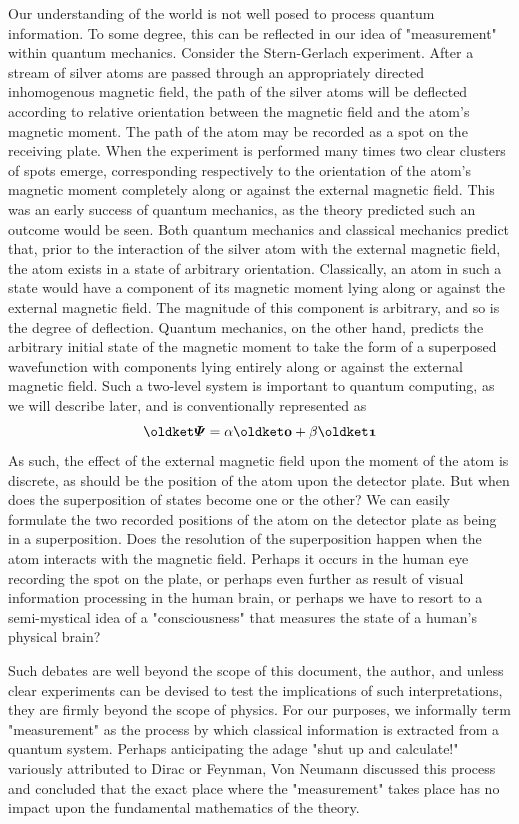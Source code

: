 Our understanding of the world is not well posed to process quantum information.
To some degree, this can be reflected in our idea of "measurement" within
quantum mechanics. Consider the Stern-Gerlach experiment\cite{SternGerlach}.
After a stream of silver atoms are passed through an appropriately directed
inhomogenous magnetic field, the path of the silver atoms will be deflected
according to relative orientation between the magnetic field and the atom's
magnetic moment. The path of the atom may be recorded as a spot on the receiving
plate. When the experiment is performed many times two clear clusters of spots
emerge, corresponding respectively to the orientation of the atom's magnetic
moment completely along or against the external magnetic field. This was an
early success of quantum mechanics, as the theory predicted such an outcome
would be seen. Both quantum mechanics and classical mechanics predict that,
prior to the interaction of the silver atom with the external magnetic field,
the atom exists in a state of arbitrary orientation. Classically, an atom in
such a state would have a component of its magnetic moment lying along or
against the external magnetic field. The magnitude of this component is
arbitrary, and so is the degree of deflection. Quantum mechanics, on the other
hand, predicts the arbitrary initial state of the magnetic moment to take the
form of a superposed wavefunction with components lying entirely along or
against the external magnetic field. Such a two-level system is important to
quantum computing, as we will describe later, and is conventionally represented
as
\begin{equation}
    \ket{\state{\Psi}} = \alpha\ket{\state{0}} + \beta\ket{\state{1}}
\end{equation}
As such, the effect of the external magnetic field upon the moment of the atom
is discrete, as should be the position of the atom upon the detector plate. But
when does the superposition of states become one or the other? We can easily
formulate the two recorded positions of the atom on the detector plate as being
in a superposition. Does the resolution of the superposition happen when the
atom interacts with the magnetic field.  Perhaps it occurs in the human eye
recording the spot on the plate, or perhaps even further as result of visual
information processing in the human brain, or perhaps we have to resort to a
semi-mystical idea of a "consciousness" that measures the state of a human's
physical brain?

Such debates are well beyond the scope of this document, the author, and unless
clear experiments can be devised to test the implications of such
interpretations, they are firmly beyond the scope of physics. For our purposes,
we informally term "measurement" as the process by which classical information
is extracted from a quantum system. Perhaps anticipating the adage "shut up and
calculate!" variously attributed to Dirac or Feynman, Von Neumann discussed this
process and concluded that the exact place where the "measurement" takes place
has no impact upon the fundamental mathematics of the theory\cite{VonNeumann}.

